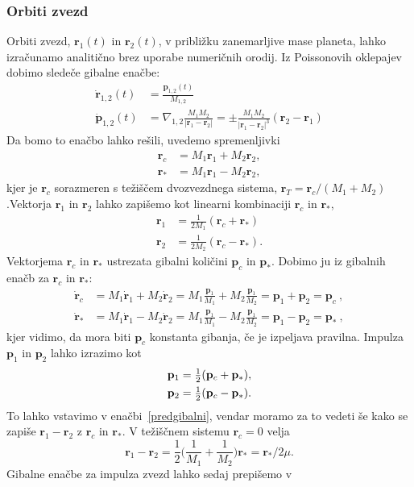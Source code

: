 \documentclass[12pt, a4paper]{article}
\renewcommand{\r}{
    \ensuremath{\mathbf{r}}
}
\newcommand{\p}{
    \ensuremath{\mathbf{p}}
}
\newcommand{\sfrac}[2]{
    \ensuremath{\textstyle{\frac{#1}{#2}}}
}
\begin{document}
\subsubsection{Orbiti zvezd}
Orbiti zvezd, $\r_1(t)$ in $\r_2(t)$, v pribli\v zku zanemarljive mase planeta, lahko izra\v cunamo analiti\v cno brez
uporabe numeri\v cnih orodij. Iz Poissonovih oklepajev dobimo slede\v ce gibalne ena\v cbe:
\begin{align}
    \dot{\r}_{1,2}(t) &= \frac{\p_{1,2}(t)}{M_{1,2}} \\
    \dot{\p}_{1,2}(t) &= \nabla_{1,2} \frac{M_1 M_2}{|\r_1 - \r_2|} = \pm \frac{M_1 M_2}{|\r_1 - \r_2|^3}(\r_2 - \r_1)
    \label{predgibalni}
\end{align}
Da bomo to ena\v cbo lahko re\v sili, uvedemo spremenljivki
\begin{align*}
    \r_c &= M_1\r_1 + M_2\r_2, \\
    \r_* &= M_1\r_1 - M_2\r_2,
\end{align*}
kjer je $\r_c$ sorazmeren s te\v zi\v s\v cem dvozvezdnega sistema, $\r_T = \r_c/(M_1 + M_2)$.Vektorja $\r_1$ in $\r_2$
lahko zapi\v semo kot linearni kombinaciji $\r_c$ in $\r_*$,
\begin{align*}
    \r_1 &= \sfrac{1}{2M_1}(\r_c + \r_*) \\
    \r_2 &= \sfrac{1}{2M_2}(\r_c - \r_*).
\end{align*}
Vektorjema $\r_c$ in $\r_*$ ustrezata gibalni koli\v cini $\p_c$ in $\p_*$. Dobimo ju iz gibalnih ena\v cb za $\r_c$
in $\r_*$:
\begin{align}
    \dot{\r}_c &= M_1\dot{\r}_1 + M_2\dot{\r}_2 = M_1\sfrac{\p_1}{M_1} + M_2\sfrac{\p_1}{M_2} = \p_1 + \p_2 = \p_c\ , \\
    \dot{\r}_* &= M_1\dot{\r}_1 - M_2\dot{\r}_2 = M_1\sfrac{\p_1}{M_1} - M_2\sfrac{\p_1}{M_2} = \p_1 - \p_2 = \p_*\ ,
\end{align}
kjer vidimo, da mora biti $\p_c$ konstanta gibanja, \v ce je izpeljava pravilna. Impulza $\p_1$ in $\p_2$ lahko
izrazimo kot
\begin{align}
    \p_1 &= \sfrac{1}{2}(\p_c + \p_*), \notag \\
    \p_2 &= \sfrac{1}{2}(\p_c - \p_*).
\end{align}
To lahko vstavimo v ena\v cbi~\eqref{predgibalni}, vendar moramo za to vedeti \v se kako se zapi\v se $\r_1 - \r_2$
z $\r_c$ in $\r_*$. V te\v zi\v s\v cnem sistemu $\r_c = 0$ velja
\[
    \r_1 - \r_2 = \sfrac{1}{2}\big(\sfrac{1}{M_1} + \sfrac{1}{M_2}\big)\r_* = \r_*/2\mu.
\]
Gibalne ena\v cbe za impulza zvezd lahko sedaj prepi\v semo v
\end{document}
